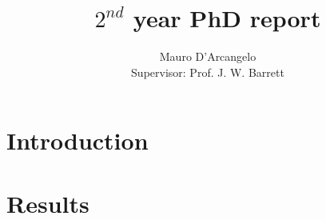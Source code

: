 \documentclass[12pt,a4paper]{article}
\title{$2^{nd}$ year PhD report}
\author{Mauro D'Arcangelo \\ Supervisor: Prof. J. W. Barrett}
\date{}
\begin{document}
\maketitle


\tableofcontents
\newpage

\section{Introduction}\label{intro}

\newpage

\section{Results}\label{results}

\newpage

\newpage

\newpage

%
%
%


\end{document}
